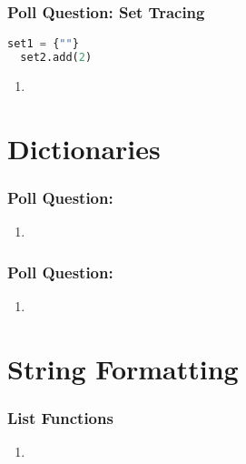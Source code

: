 \documentclass{beamer}
\begin{document}
%
%
\begin{frame}[fragile]
  \frametitle{Poll Question: Set Tracing}
  \begin{lstlisting}[language=Python]
  set1 = {""}
  set2.add(2)
  \end{lstlisting}
  \vfill
  \begin{enumerate}[A] 
    \item 
  \end{enumerate}
\end{frame}

\section{Dictionaries}

%
%
\begin{frame}[fragile]
  \frametitle{Poll Question: }
  \begin{enumerate}[A] 
    \item 
  \end{enumerate}
\end{frame}


%
%
\begin{frame}[fragile]
  \frametitle{Poll Question: }
  \begin{enumerate}[A] 
    \item 
  \end{enumerate}
\end{frame}

\section{String Formatting}

\begin{frame}[fragile]
  \frametitle{List Functions}
  \begin{enumerate}[A] 
    \item 
  \end{enumerate}
\end{frame}
\end{document}
